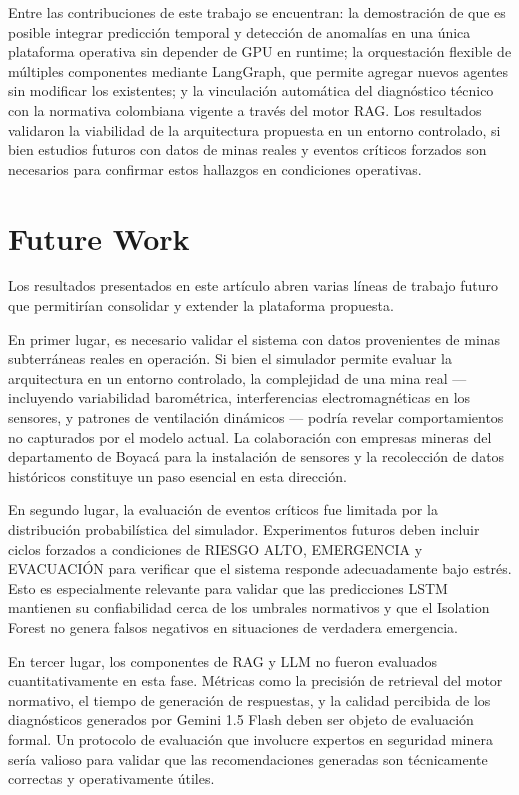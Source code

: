 \documentclass[journal,onecolumn]{IEEEtran}
\begin{document}
Entre las contribuciones de este trabajo se encuentran: la demostración de que es posible integrar predicción temporal y detección de anomalías en una única plataforma operativa sin depender de GPU en runtime; la orquestación flexible de múltiples componentes mediante LangGraph, que permite agregar nuevos agentes sin modificar los existentes; y la vinculación automática del diagnóstico técnico con la normativa colombiana vigente a través del motor RAG. Los resultados validaron la viabilidad de la arquitectura propuesta en un entorno controlado, si bien estudios futuros con datos de minas reales y eventos críticos forzados son necesarios para confirmar estos hallazgos en condiciones operativas.

\section{Future Work}
\label{sec:future_work}

Los resultados presentados en este artículo abren varias líneas de trabajo futuro que permitirían consolidar y extender la plataforma propuesta.

En primer lugar, es necesario validar el sistema con datos provenientes de minas subterráneas reales en operación. Si bien el simulador permite evaluar la arquitectura en un entorno controlado, la complejidad de una mina real — incluyendo variabilidad barométrica, interferencias electromagnéticas en los sensores, y patrones de ventilación dinámicos — podría revelar comportamientos no capturados por el modelo actual. La colaboración con empresas mineras del departamento de Boyacá para la instalación de sensores y la recolección de datos históricos constituye un paso esencial en esta dirección.

En segundo lugar, la evaluación de eventos críticos fue limitada por la distribución probabilística del simulador. Experimentos futuros deben incluir ciclos forzados a condiciones de RIESGO ALTO, EMERGENCIA y EVACUACIÓN para verificar que el sistema responde adecuadamente bajo estrés. Esto es especialmente relevante para validar que las predicciones LSTM mantienen su confiabilidad cerca de los umbrales normativos y que el Isolation Forest no genera falsos negativos en situaciones de verdadera emergencia.

En tercer lugar, los componentes de RAG y LLM no fueron evaluados cuantitativamente en esta fase. Métricas como la precisión de retrieval del motor normativo, el tiempo de generación de respuestas, y la calidad percibida de los diagnósticos generados por Gemini 1.5 Flash deben ser objeto de evaluación formal. Un protocolo de evaluación que involucre expertos en seguridad minera sería valioso para validar que las recomendaciones generadas son técnicamente correctas y operativamente útiles.
\end{document}
